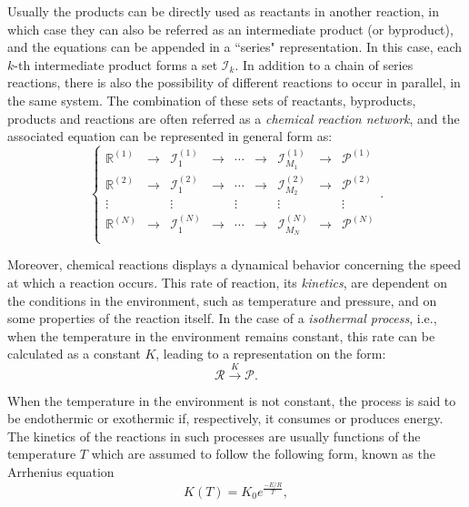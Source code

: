 \documentclass[a4paper,11pt]{book}
\numberwithin{figure}{chapter}
\numberwithin{equation}{chapter}
\numberwithin{table}{chapter}
\theoremstyle{definition}
\begin{document}
Usually the products can be directly used as reactants in another reaction, in which case they can also be referred as an intermediate product (or byproduct), and the equations can be appended in a ``series" representation. In this case, each $k$-th intermediate product forms a set $\mathcal{I}_k$. In addition to a chain of series reactions, there is also the possibility of different reactions to occur in parallel, in the same system. The combination of these sets of reactants, byproducts, products and reactions are often referred as a \textit{chemical reaction network}, and the associated equation can be represented in general form as:
\begin{equation} \label{eq:chemNetwork}
\left\{ \begin{matrix}
    \mathbb{R}^{(1)}  & \longrightarrow & \mathcal{I}^{(1)}_1  &  \longrightarrow & \cdots & \longrightarrow & \mathcal{I}^{(1)}_{M_1} & \longrightarrow & \mathcal{P}^{(1)} \\
    \mathbb{R}^{(2)} & \longrightarrow & \mathcal{I}^{(2)}_1  &  \longrightarrow & \cdots & \longrightarrow & \mathcal{I}^{(2)}_{M_2} & \longrightarrow & \mathcal{P}^{(2)} \\
    \vdots &  & \vdots &  & \vdots &  & \vdots &  & \vdots \\
    \mathbb{R}^{(N)} & \longrightarrow & \mathcal{I}^{(N)}_1  &  \longrightarrow & \cdots & \longrightarrow & \mathcal{I}^{(N)}_{M_N} & \longrightarrow & \mathcal{P}^{(N)} \\
\end{matrix} \right.
.\end{equation} 

Moreover, chemical reactions displays a dynamical behavior concerning the speed at which a reaction occurs. This rate of reaction, its \textit{kinetics}, are dependent on the conditions in the environment, such as temperature and pressure, and on some properties of the reaction itself. In the case of a \textit{isothermal process}, i.e., when the temperature in the environment remains constant, this rate can be calculated as a constant $K$, leading to a representation on the form:
\begin{equation}
    \mathcal{R} \overset{K}{\longrightarrow} \mathcal{P}
.\end{equation} 

When the temperature in the environment is not constant, the process is said to be endothermic or exothermic if, respectively, it consumes or produces energy. The kinetics of the reactions in such processes are usually functions of the temperature $T$ which are assumed to follow the following form, known as the Arrhenius equation
\begin{equation} \label{eq:arrhenius1}
    K(T) = K_0 e^{\frac{-E/R}{T}}
,\end{equation}
\end{document}
